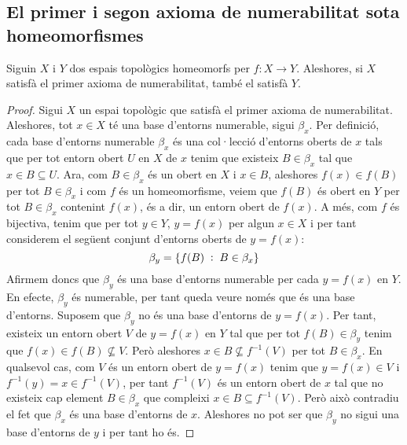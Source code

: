 \documentclass[../main.tex]{subfiles}
\begin{document}
\subsection{El primer i segon axioma de numerabilitat sota homeomorfismes}

\begin{ter}
\label{ter:1anhomeomorfisme} Siguin $X$ i $Y$ dos espais topològics homeomorfs per $f:X\rightarrow Y$. Aleshores, si $X$ satisfà el primer axioma de numerabilitat, també el satisfà $Y$.
\end{ter}
\begin{proof}
Sigui $X$ un espai topològic que satisfà el primer axioma de numerabilitat. Aleshores, tot $x\in X$ té una base d'entorns numerable, sigui $\beta_x$. Per definició, cada base d'entorns numerable $\beta_x$ és una col·lecció d'entorns oberts de $x$ tals que per tot entorn obert $U$ en $X$ de $x$ tenim que existeix $B\in\beta_x$ tal que $x\in B\subseteq U$. Ara, com $B\in\beta_x$ és un obert en $X$ i $x\in B$, aleshores $f(x)\in f(B)$ per tot $B\in \beta_x$ i com $f$ és un homeomorfisme, veiem que $f(B)$ és obert en $Y$ per tot $B\in \beta_x$ contenint $f(x)$, és a dir, un entorn obert de $f(x)$. A més, com $f$ és bijectiva, tenim que per tot $y\in Y$, $y = f(x)$ per algun $x\in X$ i per tant considerem el següent conjunt d'entorns oberts de $y = f(x)$:
\begin{equation}
    \notag
    \beta_y = \{f(B)\;:\;B\in\beta_x\}
\end{equation}
Afirmem doncs que $\beta_y$ és una base d'entorns numerable per cada $y = f(x)$ en $Y$. En efecte, $\beta_y$ és numerable, per tant queda veure només que és una base d'entorns. Suposem que $\beta_y$ no és una base d'entorns de $y = f(x)$. Per tant, existeix un entorn obert $V$ de $y = f(x)$ en $Y$ tal que per tot $f(B)\in\beta_y$ tenim que $f(x)\in f(B)\not\subseteq V$. Però aleshores $x\in B\not\subseteq f^{-1}(V)$ per tot $B\in\beta_x$. En qualsevol cas, com $V$ és un entorn obert de $y = f(x)$ tenim que $y = f(x)\in V$ i $f^{-1}(y) = x \in f^{-1}(V)$, per tant $f^{-1}(V)$ és un entorn obert de $x$ tal que no existeix cap element $B\in\beta_x$ que compleixi $x\in B\subseteq f^{-1}(V)$. Però això contradiu el fet que $\beta_x$ és una base d'entorns de $x$. Aleshores no pot ser que $\beta_y$ no sigui una base d'entorns de $y$ i per tant ho és. 
\end{proof}
\end{document}
